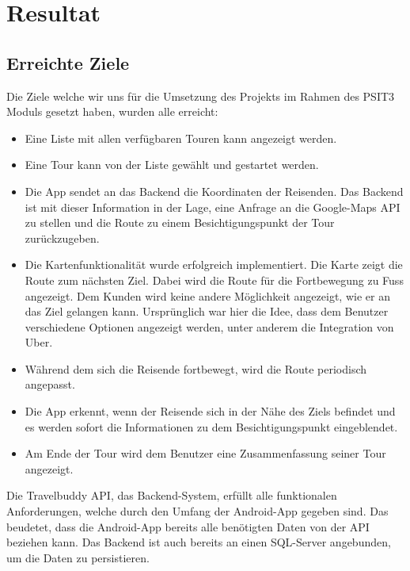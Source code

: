 \section{Resultat}
\label{resultat}
\subsection{Erreichte Ziele}
\label{erreichteZiele}
Die Ziele welche wir uns für die Umsetzung des Projekts im Rahmen des PSIT3 Moduls gesetzt haben, wurden alle erreicht:
\begin{itemize}
\item Eine Liste mit allen verfügbaren Touren kann angezeigt werden.
\item Eine Tour kann von der Liste gewählt und gestartet werden.
\item Die App sendet an das Backend die Koordinaten der Reisenden. Das Backend ist mit dieser Information in der Lage, eine Anfrage an die Google-Maps API zu stellen und die Route zu einem Besichtigungspunkt der Tour zurückzugeben.
\item Die Kartenfunktionalität wurde erfolgreich implementiert. Die Karte zeigt die Route zum nächsten Ziel. Dabei wird die Route für die Fortbewegung zu Fuss angezeigt. Dem Kunden wird keine andere Möglichkeit angezeigt, wie er an das Ziel gelangen kann. Ursprünglich war hier die Idee, dass dem Benutzer verschiedene Optionen angezeigt werden, unter anderem die Integration von Uber.
\item Während dem sich die Reisende fortbewegt, wird die Route periodisch angepasst. 
\item Die App erkennt, wenn der Reisende sich in der Nähe des Ziels befindet und es werden sofort die Informationen zu dem Besichtigungspunkt eingeblendet. 
\item Am Ende der Tour wird dem Benutzer eine Zusammenfassung seiner Tour angezeigt.
\end{itemize}

Die Travelbuddy API, das Backend-System, erfüllt alle funktionalen Anforderungen, welche durch den Umfang der Android-App gegeben sind. Das beudetet, dass die Android-App bereits alle benötigten Daten von der API beziehen kann. Das Backend ist auch bereits an einen SQL-Server angebunden, um die Daten zu persistieren. 

